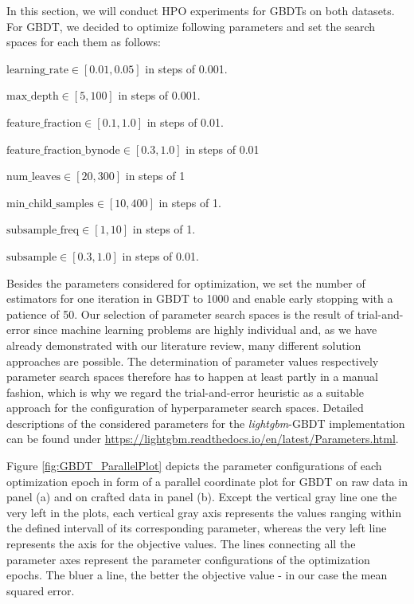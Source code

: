 In this section, we will conduct HPO experiments for GBDTs on both datasets. 
For GBDT, we decided to optimize following parameters and set the search spaces for each them as follows:
\begin{description}[font=$\bullet$\scshape\bfseries]
	\item $ \text{learning\_rate} \in [0.01, 0.05] $  in steps of 0.001.
	\item $ \text{max\_depth} \in [5, 100] $ in steps of 0.001.
	\item $ \text{feature\_fraction} \in [0.1, 1.0] $ in steps of 0.01.
	\item $ \text{feature\_fraction\_bynode} \in [0.3, 1.0] $ in steps of 0.01
	\item $ \text{num\_leaves} \in [20, 300] $ in steps of 1
	\item $ \text{min\_child\_samples} \in [10, 400] $ in steps of 1.
	\item $ \text{subsample\_freq} \in [1, 10] $ in steps of 1.
	\item $ \text{subsample} \in [0.3, 1.0] $ in steps of 0.01.
\end{description}
Besides the parameters considered for optimization, we set the number of estimators for one iteration in GBDT to 1000 and enable early stopping with a patience of 50. Our selection of parameter search spaces is the result of trial-and-error since machine learning problems are highly individual and, as we have already demonstrated with our literature review, many different solution approaches are possible. The determination of parameter values respectively parameter search spaces therefore has to happen at least partly in a manual fashion, which is why we regard the trial-and-error heuristic as a suitable approach for the configuration of hyperparameter search spaces. Detailed descriptions of the considered parameters for the \textit{lightgbm}-GBDT implementation can be found under \url{https://lightgbm.readthedocs.io/en/latest/Parameters.html}.

Figure \ref{fig:GBDT_ParallelPlot} depicts the parameter configurations of each optimization epoch in form of a parallel coordinate plot for GBDT on raw data in panel (a) and on crafted data in panel (b). Except the vertical gray line one the very left in the plots, each vertical gray axis represents the values ranging within the defined intervall of its corresponding parameter, whereas the very left line represents the axis for the objective values. The lines connecting all the parameter axes represent the parameter configurations of the optimization epochs. The bluer a line, the better the objective value - in our case the mean squared error. 

